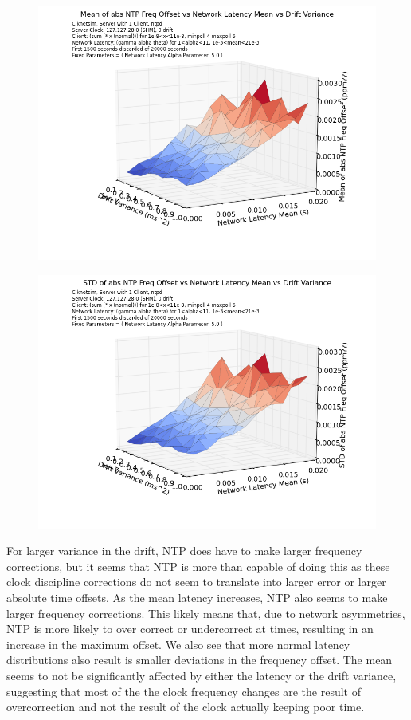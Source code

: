 \begin{figure}[h]
  \includegraphics[width=1\linewidth]{mean_abs_freq-mean_latency-drift_var.png}
\end{figure}

\begin{figure}[h]
  \includegraphics[width=1\linewidth]{stddev_abs_freq-mean_latency-drift_var.png}
\end{figure}

For larger variance in the drift, NTP does have to make larger
frequency corrections, but it seems that NTP is more than capable of
doing this as these clock discipline corrections do not seem to
translate into larger error or larger absolute time offsets. As the
mean latency increases, NTP also seems to make larger frequency
corrections. This likely means that, due to network asymmetries, NTP
is more likely to over correct or undercorrect at times, resulting in
an increase in the maximum offset. We also see that more normal
latency distributions also result is smaller deviations in the
frequency offset. The mean seems to not be significantly affected by
either the latency or the drift variance, suggesting that most of the
the clock frequency changes are the result of overcorrection and not
the result of the clock actually keeping poor time.

